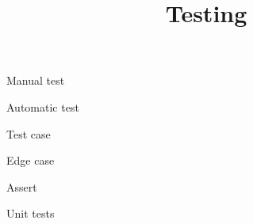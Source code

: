 \documentclass{handout}
\title{Testing}
\begin{document}
Manual test

Automatic test

  Test case

  Edge case

Assert

Unit tests
\end{document}
